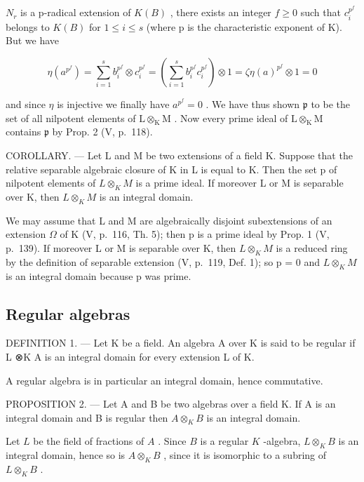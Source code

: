 \(N_{r}\) is a p-radical extension of \(K(B)\) , there exists an integer \(f \geqslant 0\) such that \(c_{i}^{p^{f}}\) belongs to \(K(B)\) for \(1 \leqslant i \leqslant s\) (where p is the characteristic exponent of K). But we have

\[
\eta \left(a ^ {p ^ {f}}\right) = \sum_ {i = 1} ^ {s} b _ {i} ^ {p ^ {f}} \otimes c _ {i} ^ {p ^ {f}} = \left(\sum_ {i = 1} ^ {s} b _ {i} ^ {p ^ {f}} c _ {i} ^ {p ^ {f}}\right) \otimes 1 = \zeta \eta (a) ^ {p ^ {f}} \otimes 1 = 0
\]

and since \(\eta\) is injective we finally have \(a^{p^{f}} = 0\) . We have thus shown \(\mathfrak{p}\) to be the set of all nilpotent elements of \(\mathrm{L} \otimes_{\mathrm{K}} \mathrm{M}\) . Now every prime ideal of \(\mathrm{L} \otimes_{\mathrm{K}} \mathrm{M}\) contains \(\mathfrak{p}\) by Prop. 2 (V, p.~118).

COROLLARY. --- Let L and M be two extensions of a field K. Suppose that the relative separable algebraic closure of K in L is equal to K. Then the set p of nilpotent elements of \(L \otimes_{K} M\) is a prime ideal. If moreover L or M is separable over K, then \(L \otimes_{K} M\) is an integral domain.

We may assume that L and M are algebraically disjoint subextensions of an extension \(\Omega\) of K (V, p.~116, Th. 5); then p is a prime ideal by Prop. 1 (V, p.~139). If moreover L or M is separable over K, then \(L \otimes_{K} M\) is a reduced ring by the definition of separable extension (V, p.~119, Def. 1); so p = 0 and \(L \otimes_{K} M\) is an integral domain because p was prime.

\subsection{Regular algebras}

DEFINITION 1. --- Let K be a field. An algebra A over K is said to be regular if L ⊗K A is an integral domain for every extension L of K.

A regular algebra is in particular an integral domain, hence commutative.

PROPOSITION 2. --- Let A and B be two algebras over a field K. If A is an integral domain and B is regular then \(A \otimes_{K} B\) is an integral domain.

Let \(L\) be the field of fractions of \(A\) . Since \(B\) is a regular \(K\) -algebra, \(L \otimes_K B\) is an integral domain, hence so is \(A \otimes_K B\) , since it is isomorphic to a subring of \(L \otimes_K B\) .

